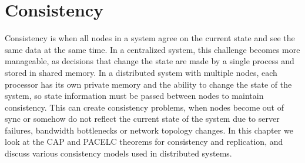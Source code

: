 \chapter{Consistency} \label{ch:consistency}

Consistency is when all nodes in a system agree on the current state and see the same data at the same time. In a centralized system, this challenge becomes more manageable, as decisions that change the state are made by a single process and stored in shared memory. In a distributed system with multiple nodes, each processor has its own private memory and the ability to change the state of the system, so state information must be passed between nodes to maintain consistency. This can create consistency problems, when nodes become out of sync or somehow do not reflect the current state of the system due to server failures, bandwidth bottlenecks or network topology changes. In this chapter we look at the CAP and PACELC theorems for consistency and replication, and discuss various consistency models used in distributed systems.




